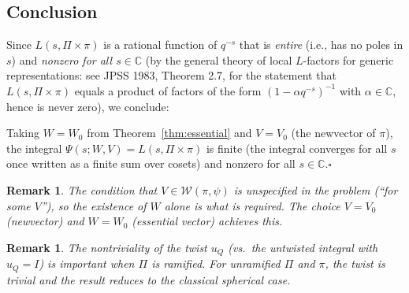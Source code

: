 \documentclass[12pt]{article}
\newtheorem{remark}[theorem]{Remark}
\begin{document}
\subsection*{Conclusion}

Since $L(s,\Pi\times\pi)$ is a rational function of $q^{-s}$ that is \emph{entire} (i.e., has no poles in $s$) and \emph{nonzero for all $s \in \mathbb{C}$} (by the general theory of local $L$-factors for generic representations: see JPSS 1983, Theorem 2.7, for the statement that $L(s,\Pi\times\pi)$ equals a product of factors of the form $(1 - \alpha q^{-s})^{-1}$ with $\alpha \in \mathbb{C}$, hence is never zero), we conclude:

Taking $W = W_0$ from Theorem~\ref{thm:essential} and $V = V_0$ (the newvector of $\pi$), the integral $\Psi(s;W,V) = L(s,\Pi\times\pi)$ is finite (the integral converges for all $s$ once written as a finite sum over cosets) and nonzero for all $s \in \mathbb{C}$.\hfill$\square$

\begin{remark}
The condition that $V \in \mathcal{W}(\pi,\psi)$ is unspecified in the problem (``for some $V$''), so the existence of $W$ alone is what is required.  The choice $V = V_0$ (newvector) and $W = W_0$ (essential vector) achieves this.
\end{remark}

\begin{remark}
The nontriviality of the twist $u_Q$ (vs.\ the untwisted integral with $u_Q = I$) is important when $\Pi$ is ramified.  For unramified $\Pi$ and $\pi$, the twist is trivial and the result reduces to the classical spherical case.
\end{remark}
\end{document}
